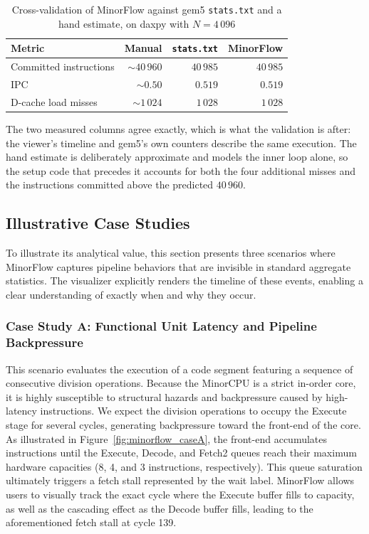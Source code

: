 \documentclass{ceurart}
\begin{document}
\begin{table}[ht]
  \centering
  \caption{Cross-validation of MinorFlow against gem5
           \texttt{stats.txt} and a hand estimate, on daxpy with
           \(N=4\,096\)}
  \label{tab:daxpy_validation}
  \begin{tabular*}{0.8\textwidth}{@{\extracolsep{\fill}}lrrr@{}}
    \toprule
    Metric                  & Manual         & \texttt{stats.txt} & MinorFlow  \\
    \midrule
    Committed instructions  & $\sim 40\,960$  & $40\,985$        & $40\,985$   \\
    IPC                     & $\sim 0.50$     & $0.519$          & $0.519$     \\
    D-cache load misses     & $\sim 1\,024$   & $1\,028$         & $1\,028$    \\
    \bottomrule
  \end{tabular*}
\end{table}

The two measured columns agree exactly, which is what the validation is after: the viewer's timeline and gem5's own counters describe the same execution. The hand estimate is deliberately approximate and models the inner loop alone, so the setup code that precedes it accounts for both the four additional misses and the instructions committed above the predicted \(40\,960\).

\subsection{Illustrative Case Studies}

To illustrate its analytical value, this section presents three scenarios where MinorFlow captures pipeline behaviors that are invisible in standard aggregate statistics. The visualizer explicitly renders the timeline of these events, enabling a clear understanding of exactly when and why they occur.

\subsubsection{Case Study A: Functional Unit Latency and Pipeline Backpressure}

This scenario evaluates the execution of a code segment featuring a sequence of consecutive division operations. Because the MinorCPU is a strict in-order core, it is highly susceptible to structural hazards and backpressure caused by high-latency instructions. We expect the division operations to occupy the Execute stage for several cycles, generating backpressure toward the front-end of the core. As illustrated in Figure~\ref{fig:minorflow_caseA}, the front-end accumulates instructions until the Execute, Decode, and Fetch2 queues reach their maximum hardware capacities (8, 4, and 3 instructions, respectively). This queue saturation ultimately triggers a fetch stall represented by the wait label. MinorFlow allows users to visually track the exact cycle where the Execute buffer fills to capacity, as well as the cascading effect as the Decode buffer fills, leading to the aforementioned fetch stall at cycle 139.
\end{document}
